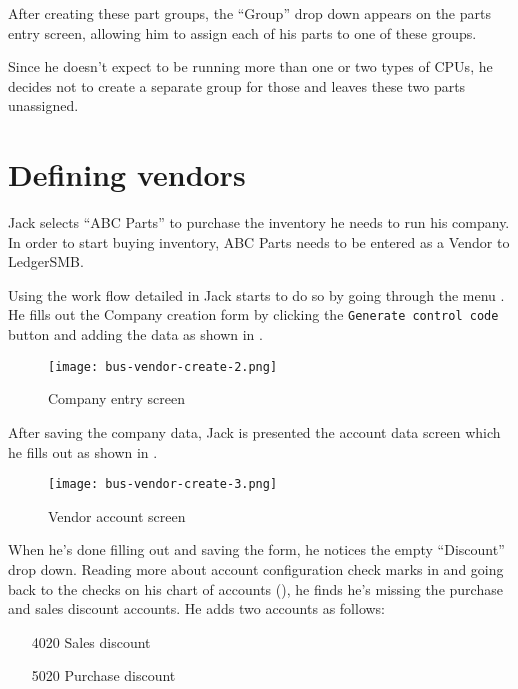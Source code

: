 After creating these part groups, the ``Group'' drop down appears on the parts entry screen,
allowing him to assign each of his parts to one of these groups.

Since he doesn't expect to be running more than one or two types of CPUs, he decides
not to create a separate group for those and leaves these two parts unassigned.

\section{Defining vendors}
\label{sec-stock-defining-vendors}

Jack selects ``ABC Parts'' to purchase the inventory he needs to run his company. In
order to start buying inventory, ABC Parts needs to be entered as a Vendor to LedgerSMB.

Using the work flow detailed in  Jack starts to do so by going through the menu .
He fills out the Company creation form by clicking the {\tt Generate control code}
button and adding the data as shown in .

\begin{figure}[h]
\centering
\texttt{[image: bus-vendor-create-2.png]}
\caption{Company entry screen}
\label{fig:vendor-create-1}
\end{figure}

After saving the company data, Jack is presented the account data screen which he fills out
as shown in .

\begin{figure}[h]
\centering
\texttt{[image: bus-vendor-create-3.png]}
\caption{Vendor account screen}
\label{fig:vendor-create-2}
\end{figure}

When he's done filling out and saving the form,
he notices the empty ``Discount'' drop down. Reading more about account configuration
check marks in  and going back to the checks on his
chart of accounts (), he finds he's missing the purchase and
sales discount accounts. He adds two accounts as follows:

\begin{itemize}
\item [4020] Sales discount
\item [5020] Purchase discount
\end{itemize}

